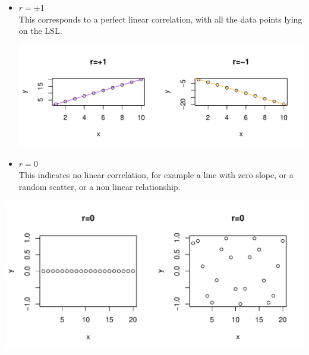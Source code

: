 \documentclass[t,xcolor=pdftex,dvipsnames,table]{beamer}
\makeatletter
\def\maxwidth{ %
  \ifdim\Gin@nat@width>\linewidth
    \linewidth
  \else
    \Gin@nat@width
  \fi
}
\newenvironment{knitrout}{}{} %
\makeatother
\begin{document}
\begin{frame}[fragile]{}
\begin{itemize}
\item  $r=\pm 1$ \\
This corresponds to a perfect linear correlation, with all the data points lying on the LSL.

\begin{knitrout}
\color{fgcolor}
\includegraphics[width=\maxwidth]{figure/unnamed-chunk-8-1} 

\end{knitrout}
\end{itemize}
\end{frame} 

\begin{frame}[fragile]{}
\begin{itemize}
\item $r=0 $ \\
This indicates no linear correlation, for example a line with zero slope, or a random scatter, or a non linear relationship.
\end{itemize}
\begin{knitrout}
\color{fgcolor}
\includegraphics[width=\maxwidth]{figure/unnamed-chunk-9-1} 

\end{knitrout}
\end{frame} 
\end{document}
